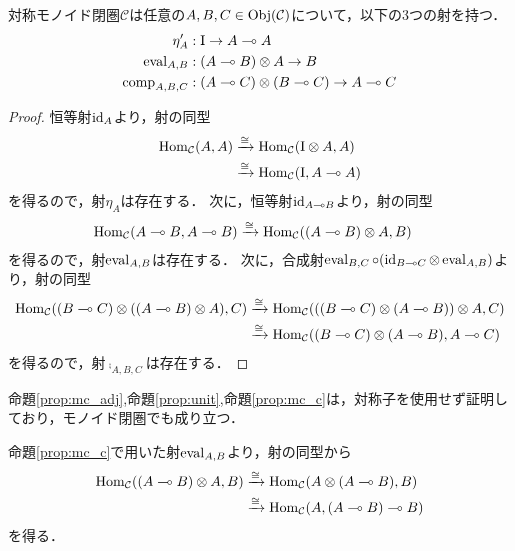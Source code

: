\documentclass[type_judgement.tex]{subfiles}
\begin{document}
\begin{prop}
\label{prop:mc_c}
対称モノイド閉圏$\mathcal{C}$は任意の$A,B,C\in\mathop{\mathrm{Obj}}\nolimits(\mathcal{C})$について，以下の3つの射を持つ．
\begin{align*}
    \eta_{A}'    &: \mathrm{I} \rightarrow A \multimap A \\
    \mathop{\mathrm{eval}}\nolimits_{A,B}   &: (A \multimap B) \otimes A \rightarrow B \\
    \mathop{\mathrm{comp}}\nolimits_{A,B,C} &: (A \multimap C) \otimes (B \multimap C) \rightarrow A \multimap C
\end{align*}
\end{prop}
\begin{proof}
恒等射$\mathop{\mathrm{id}}\nolimits_A$より，射の同型
\begin{align*}
    \mathop{\mathrm{Hom}}\nolimits_\mathcal{C}(A,A) &\xrightarrow{\cong} \mathop{\mathrm{Hom}}\nolimits_\mathcal{C}(\mathrm{I} \otimes A, A) \\
    &\xrightarrow{\cong} \mathop{\mathrm{Hom}}\nolimits_\mathcal{C}(\mathrm{I}, A \multimap A)
\end{align*}
を得るので，射$\eta_{A}$は存在する．
次に，恒等射$\mathop{\mathrm{id}}\nolimits_{A \multimap B}$より，射の同型
\begin{align*}
    \mathop{\mathrm{Hom}}\nolimits_\mathcal{C}(A \multimap B, A \multimap B) &\xrightarrow{\cong} \mathop{\mathrm{Hom}}\nolimits_\mathcal{C}((A \multimap B) \otimes A, B)
\end{align*}
を得るので，射$\mathop{\mathrm{eval}}\nolimits_{A,B}$は存在する．
次に，合成射$\mathop{\mathrm{eval}}\nolimits_{B,C}\circ(\mathop{\mathrm{id}}\nolimits_{B\multimap{}C}\otimes \mathop{\mathrm{eval}}\nolimits_{A,B})$より，射の同型
\begin{align*}
    \mathop{\mathrm{Hom}}\nolimits_\mathcal{C}((B \multimap C)\otimes((A \multimap B)\otimes A), C) &\xrightarrow{\cong} \mathop{\mathrm{Hom}}\nolimits_\mathcal{C}( ((B \multimap C)\otimes(A \multimap B)) \otimes A, C) \\
    &\xrightarrow{\cong} \mathop{\mathrm{Hom}}\nolimits_\mathcal{C}((B \multimap C) \otimes (A \multimap B), A \multimap C)
\end{align*}
を得るので，射$\comp_{A,B,C}$は存在する．
\end{proof}

命題\ref{prop:mc_adj},命題\ref{prop:unit},命題\ref{prop:mc_c}は，対称子を使用せず証明しており，モノイド閉圏でも成り立つ．

命題\ref{prop:mc_c}で用いた射$\mathop{\mathrm{eval}}\nolimits_{A,B}$より，射の同型から
\begin{align*}
    \mathop{\mathrm{Hom}}\nolimits_\mathcal{C}((A\multimap B) \otimes A, B) &\xrightarrow{\cong} \mathop{\mathrm{Hom}}\nolimits_\mathcal{C}(A \otimes (A \multimap B), B) \\
    &\xrightarrow{\cong} \mathop{\mathrm{Hom}}\nolimits_\mathcal{C}(A, (A \multimap B) \multimap B)
\end{align*}
を得る．
\end{document}
